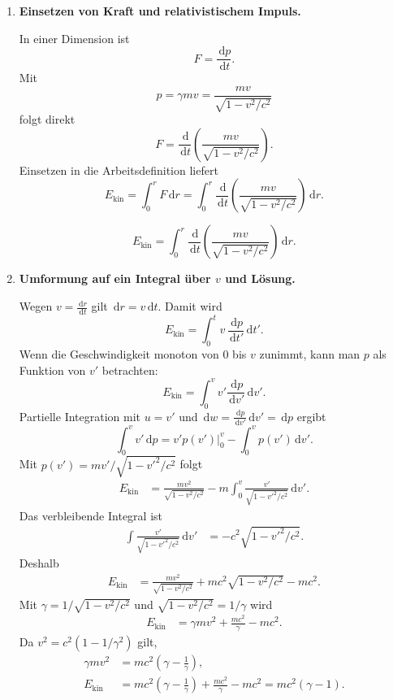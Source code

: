 \documentclass[11pt,a4paper]{scrartcl}
\newcommand{\paren}[1]{\left( #1 \right)}
\newcommand{\dd}{\,\mathrm{d}}
\newcommand{\dv}[2]{\frac{\dd #1}{\dd #2}}
\newcommand{\evalat}[2]{\left. #1 \right|_{#2}}
\theoremstyle{definition}
\theoremstyle{plain}
\theoremstyle{remark}
\begin{document}
\begin{enumerate}[label=(\alph*)]
    \item \textbf{Einsetzen von Kraft und relativistischem Impuls.}

    \begin{calculationbox}
    In einer Dimension ist
    \[
        F = \dv{p}{t}.
    \]
    Mit
    \[
        p=\gamma mv=\frac{mv}{\sqrt{1-v^2/c^2}}
    \]
    folgt direkt
    \[
        F
        = \dv{}{t}\paren{\frac{mv}{\sqrt{1-v^2/c^2}}}.
    \]
    Einsetzen in die Arbeitsdefinition liefert
    \[
        E_{\mathrm{kin}}
        =\int_0^r F\dd r
        =\int_0^r
        \dv{}{t}\paren{\frac{mv}{\sqrt{1-v^2/c^2}}}\dd r.
    \]
    \end{calculationbox}

    \begin{answerbox}
    \[
        \boxed{
        E_{\mathrm{kin}}
        =\int_0^r
        \dv{}{t}\paren{\frac{mv}{\sqrt{1-v^2/c^2}}}\dd r
        }.
    \]
    \end{answerbox}

    \item \textbf{Umformung auf ein Integral über $v$ und Lösung.}

    \begin{calculationbox}
    Wegen $v=\dv{r}{t}$ gilt $\dd r=v\dd t$. Damit wird
    \[
        E_{\mathrm{kin}}
        = \int_0^t v\,\dv{p}{t'}\dd t'.
    \]
    Wenn die Geschwindigkeit monoton von $0$ bis $v$ zunimmt, kann man $p$ als Funktion von $v'$ betrachten:
    \[
        E_{\mathrm{kin} }
        = \int_0^v v'\dv{p}{v'}\dd v'.
    \]
    Partielle Integration mit $u=v'$ und $\dd w=\dv{p}{v'}\dd v'=\dd p$ ergibt
    \[
        \int_0^v v'\dd p
        = \evalat{v'p(v')}{0}^{v}-\int_0^v p(v')\dd v'.
    \]
    Mit $p(v')=m v'/\sqrt{1-v'^2/c^2}$ folgt
    \begin{align*}
        E_{\mathrm{kin}}
        &= \frac{mv^2}{\sqrt{1-v^2/c^2}}
           -m\int_0^v \frac{v'}{\sqrt{1-v'^2/c^2}}\dd v'.
    \end{align*}
    Das verbleibende Integral ist
    \begin{align*}
        \int \frac{v'}{\sqrt{1-v'^2/c^2}}\dd v'
        &= -c^2\sqrt{1-v'^2/c^2}.
    \end{align*}
    Deshalb
    \begin{align*}
        E_{\mathrm{kin}}
        &= \frac{mv^2}{\sqrt{1-v^2/c^2}}
           +mc^2\sqrt{1-v^2/c^2}-mc^2.
    \end{align*}
    Mit $\gamma=1/\sqrt{1-v^2/c^2}$ und $\sqrt{1-v^2/c^2}=1/\gamma$ wird
    \begin{align*}
        E_{\mathrm{kin}}
        &= \gamma mv^2 + \frac{mc^2}{\gamma}-mc^2.
    \end{align*}
    Da $v^2=c^2(1-1/\gamma^2)$ gilt,
    \begin{align*}
        \gamma mv^2
        &= mc^2\paren{\gamma-\frac{1}{\gamma}},\\
        E_{\mathrm{kin}}
        &= mc^2\paren{\gamma-\frac{1}{\gamma}}+\frac{mc^2}{\gamma}-mc^2
         = mc^2(\gamma-1).
    \end{align*}
    \end{calculationbox}


\end{enumerate}
\end{document}
